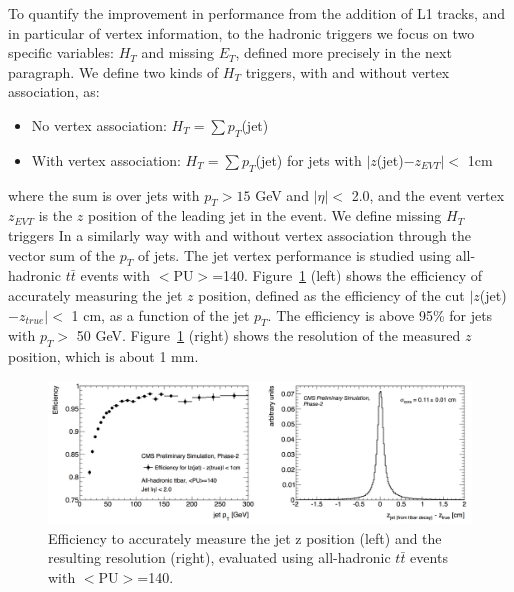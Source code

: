 \documentclass{PoS}
\begin{document}
To quantify the improvement in performance from the addition of L1 tracks, and in particular of vertex information, to the hadronic triggers we focus on two specific variables: $H_T$ and missing $E_T$, defined more precisely in the next paragraph. We define two kinds of $H_T$ triggers, with and without vertex association, as:
\begin{itemize}
\item No vertex association: $H_T = \sum p_T$(jet)
\item With vertex association: $H_T = \sum p_T$(jet) for jets with $|z$(jet)$ - z_{EVT}| <$ 1cm
\end{itemize}
where the sum is over jets with $p_T > 15$ GeV and $|\eta| <$ 2.0, and the event vertex $z_{EVT}$ is the $z$ position of the leading jet in the event. We define missing $H_T$ triggers In a similarly way with and without vertex association through the vector sum of the $p_T$ of jets.
The jet vertex performance is studied using all-hadronic $t\bar{t}$ events with $<$PU$>$=140. Figure~\ref{fig:JetVertex} (left) shows the efficiency of accurately measuring the jet $z$ position, defined as the efficiency of the cut $|z$(jet)$ - z_{true}| <$ 1 cm, as a function of the jet $p_T$. The efficiency is above 95\% for jets with $p_T >$ 50 GeV. Figure~\ref{fig:JetVertex} (right) shows the resolution of the measured $z$ position, which is about 1 mm.
\begin{figure}[h!]
  \centering
	\includegraphics[width=\textwidth]{Figures/JetVertex.png}
	\caption{Efficiency to accurately measure the jet z position (left) and the resulting resolution (right), evaluated using all-hadronic $t\bar{t}$ events with $<$PU$>$=140.}
	\label{fig:JetVertex}
\end{figure}
\end{document}
